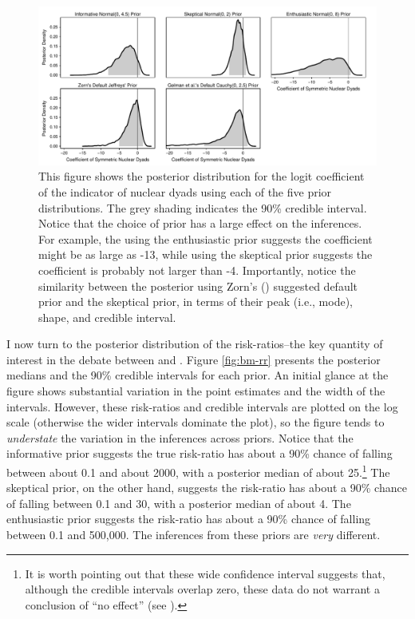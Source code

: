 \documentclass[12pt]{article}
\begin{document}
\begin{figure}[H]
\begin{center}
\includegraphics[scale = .8]{figs/bm-posterior-density.pdf}
\caption{This figure shows the posterior distribution for the logit coefficient of the indicator of nuclear dyads using each of the five prior distributions.  
The grey shading indicates the 90\% credible interval. 
Notice that the choice of prior has a large effect on the inferences. 
For example, the using the enthusiastic prior suggests the coefficient might be as large as -13, while using the skeptical prior suggests the coefficient is probably not larger than -4. 
Importantly, notice the similarity between the posterior using Zorn's (\citeyear{Zorn2005}) suggested default prior and the skeptical prior, in terms of their peak (i.e., mode), shape, and credible interval.}\label{fig:bm-posterior-density}
\end{center}
\end{figure}

I now turn to the posterior distribution of the risk-ratios--the key quantity of interest in the debate between \cite{BellMiller2015} and \cite{Rauchhaus2009}. 
Figure \ref{fig:bm-rr} presents the posterior medians and the 90\% credible intervals for each prior. 
An initial glance at the figure shows substantial variation in the point estimates and the width of the intervals. 
However, these risk-ratios and credible intervals are plotted on the log scale (otherwise the wider intervals dominate the plot), so the figure tends to \textit{understate} the variation in the inferences across priors. 
Notice that the informative prior suggests the true risk-ratio has about a 90\% chance of falling between about 0.1 and about 2000, with a posterior median of about 25.\footnote{
It is worth pointing out that these wide confidence interval suggests that, although the credible intervals overlap zero, these data do not warrant a conclusion of ``no effect'' (see \citealt{Rainey2014a}).} 
The skeptical prior, on the other hand, suggests the risk-ratio has about a 90\% chance of falling between 0.1 and 30, with a posterior median of about 4. 
The enthusiastic prior suggests the risk-ratio has about a 90\% chance of falling between 0.1 and 500,000. 
The inferences from these priors are \emph{very} different. 
\end{document}
